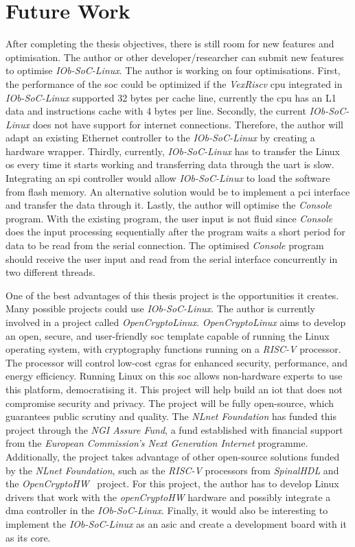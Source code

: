 \section{Future Work}
\label{section:future}
After completing the thesis objectives, there is still room for new features and optimisation. The author or other developer/researcher can submit new features to optimise \textit{IOb-SoC-Linux}. The author is working on four optimisations. First, the performance of the \acrshort{soc} could be optimized if the \textit{VexRiscv} \acrshort{cpu} integrated in \textit{IOb-SoC-Linux} supported 32 bytes per cache line, currently the \acrshort{cpu} has an L1 data and instructions cache with 4 bytes per line. Secondly, the current \textit{IOb-SoC-Linux} does not have support for internet connections. Therefore, the author will adapt an existing Ethernet controller to the \textit{IOb-SoC-Linux} by creating a hardware wrapper. Thirdly, currently, \textit{IOb-SoC-Linux} has to transfer the Linux \acrshort{os} every time it starts working and transferring data through the \acrshort{uart} is slow. Integrating an \acrfull{spi} controller would allow \textit{IOb-SoC-Linux} to load the software from flash memory. An alternative solution would be to implement a \acrshort{pci} interface and transfer the data through it. Lastly, the author will optimise the \textit{Console} program. With the existing program, the user input is not fluid since \textit{Console} does the input processing sequentially after the program waits a short period for data to be read from the serial connection. The optimised \textit{Console} program should receive the user input and read from the serial interface concurrently in two different threads.

One of the best advantages of this thesis project is the opportunities it creates. Many possible projects could use \textit{IOb-SoC-Linux}. The author is currently involved in a project called \textit{OpenCryptoLinux}. \textit{OpenCryptoLinux} aims to develop an open, secure, and user-friendly \acrshort{soc} template capable of running the Linux operating system, with cryptography functions running on a \textit{RISC-V} processor. The processor will control low-cost \acrfull{cgras} for enhanced security, performance, and energy efficiency. Running Linux on this \acrshort{soc} allows non-hardware experts to use this platform, democratising it. This project will help build an \acrfull{iot} that does not compromise security and privacy. The project will be fully open-source, which guarantees public scrutiny and quality. The \textit{NLnet Foundation} has funded this project through the \textit{NGI Assure Fund}, a fund established with financial support from the \textit{European Commission's Next Generation Internet} programme. Additionally, the project takes advantage of other open-source solutions funded by the \textit{NLnet Foundation}, such as the \textit{RISC-V} processors from \textit{SpinalHDL} and the \textit{OpenCryptoHW}~\cite{open_crypto_hw} project. For this project, the author has to develop Linux drivers that work with the \textit{openCryptoHW} hardware and possibly integrate a \acrshort{dma} controller in the \textit{IOb-SoC-Linux}. Finally, it would also be interesting to implement the \textit{IOb-SoC-Linux} as an \acrshort{asic} and create a development board with it as its core.
